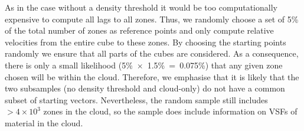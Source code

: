As in the case without a density threshold it would be too computationally expensive to compute all lags to all zones.
Thus, we randomly choose a set of 5\% of the total number of zones as reference points and only compute relative velocities from the entire cube to these zones.
By choosing the starting points randomly we ensure that all parts of the cubes are considered. 
As a consequence, there is only a small likelihood (5\%~$\times$~1.5\%~=~0.075\%) that any given zone chosen will be within the cloud.
Therefore, we emphasise that it is likely that the two subsamples (no density threshold and cloud-only) do not have a common subset of starting vectors.
Nevertheless, the random sample still includes $>4 \times 10^3$ zones in the cloud, so the sample does include information on VSFs of material in the cloud.

\endinput
